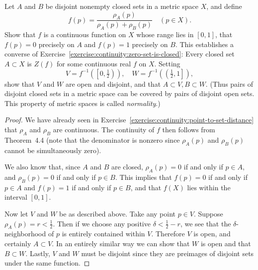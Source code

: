  Let $A$ and $B$ be disjoint nonempty closed sets in a
metric space $X$, and define
\begin{equation*}
  f(p) = \frac{\rho_A(p)}{\rho_A(p) + \rho_B(p)}
  \quad (p\in X).
\end{equation*}
Show that $f$ is a continuous function on $X$ whose range lies in
$[0,1]$, that $f(p) = 0$ precisely on $A$ and $f(p) = 1$ precisely on
$B$. This establishes a converse of
Exercise~\ref{exercise:continuity:zero-set-is-closed}: Every closed
set $A\subset X$ is $Z(f)$ for some continuous real $f$ on
$X$. Setting
\begin{equation*}
  V = f^{-1}\left(\left[0, \tfrac12\right)\right),
  \quad W = f^{-1}\left(\left(\tfrac12, 1\right]\right),
\end{equation*}
show that $V$ and $W$ are open and disjoint, and that
$A\subset V, B\subset W$. (Thus pairs of disjoint closed sets in a
metric space can be covered by pairs of disjoint open sets. This
property of metric spaces is called {\em normality}.)
\begin{proof}
  We have already seen in
  Exercise~\ref{exercise:continuity:point-to-set-distance} that
  $\rho_A$ and $\rho_B$ are continuous. The continuity of $f$ then
  follows from Theorem~4.4 (note that the denominator is nonzero since
  $\rho_A(p)$ and $\rho_B(p)$ cannot be simultaneously zero).

  We also know that, since $A$ and $B$ are closed, $\rho_A(p) = 0$ if
  and only if $p\in A$, and $\rho_B(p) = 0$ if and only if $p\in
  B$. This implies that $f(p) = 0$ if and only if $p\in A$ and
  $f(p) = 1$ if and only if $p\in B$, and that $f(X)$ lies within the
  interval $[0,1]$.

  Now let $V$ and $W$ be as described above. Take any point $p\in
  V$. Suppose $\rho_A(p) = r < \frac12$. Then if we choose any
  positive $\delta < \frac12 - r$, we see that the
  $\delta$-neighborhood of $p$ is entirely contained within
  $V$. Therefore $V$ is open, and certainly $A\subset V$. In an
  entirely similar way we can show that $W$ is open and that
  $B\subset W$. Lastly, $V$ and $W$ must be disjoint since they are
  preimages of disjoint sets under the same function.
\end{proof}


